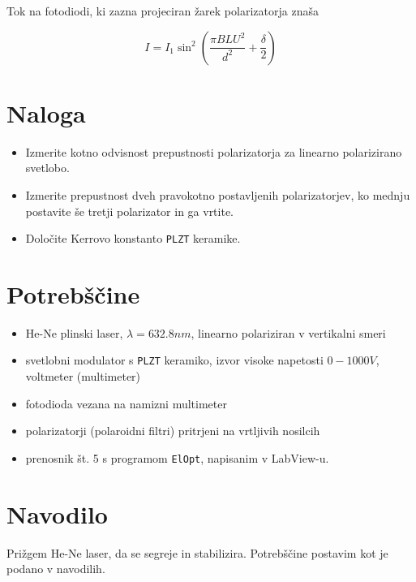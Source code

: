 \documentclass[12pt]{report}
\begin{document}
Tok na fotodiodi, ki zazna projeciran žarek polarizatorja znaša 

\begin{equation}\label{eq:ftd}
  I = I_1 \sin^2\left(\frac{\pi B L U^2}{d^2} + \frac{\delta}{2}\right)
\end{equation}

\chapter*{Naloga}

\begin{itemize}
  \item Izmerite kotno odvisnost prepustnosti polarizatorja za linearno polarizirano svetlobo.
  \item Izmerite prepustnost dveh pravokotno postavljenih polarizatorjev, ko mednju postavite še tretji polarizator in ga vrtite. 
  \item Določite Kerrovo konstanto \verb+PLZT+ keramike. 
\end{itemize}

\begingroup
\let\clearpage\relax

\chapter*{Potrebščine}
\begin{itemize}
\item He-Ne plinski laser, $\lambda = 632.8\si{nm}$, linearno polariziran v vertikalni smeri 
\item svetlobni modulator s \verb+PLZT+ keramiko, izvor visoke napetosti $0-1000\si{V}$, voltmeter (multimeter)
\item fotodioda vezana na namizni multimeter 
\item polarizatorji (polaroidni filtri) pritrjeni na vrtljivih nosilcih
\item prenosnik št. 5 s programom \verb+ElOpt+, napisanim v LabView-u.
\end{itemize}

\chapter*{Navodilo}

Prižgem He-Ne laser, da se segreje in stabilizira. Potrebščine postavim kot je podano v navodilih. 
\end{document}
